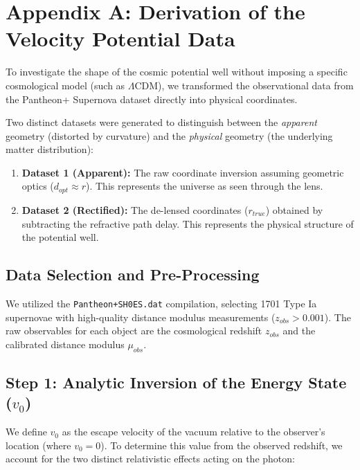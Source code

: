 \documentclass[11pt]{article}
\begin{document}
\appendix

\section{Appendix A: Derivation of the Velocity Potential Data}
\label{app:data_reconstruction}

To investigate the shape of the cosmic potential well without imposing a specific cosmological model (such as $\Lambda$CDM), we transformed the observational data from the Pantheon+ Supernova dataset directly into physical coordinates.

Two distinct datasets were generated to distinguish between the \textit{apparent} geometry (distorted by curvature) and the \textit{physical} geometry (the underlying matter distribution):
\begin{enumerate}
    \item \textbf{Dataset 1 (Apparent):} The raw coordinate inversion assuming geometric optics ($d_{opt} \approx r$). This represents the universe as seen through the lens.
    \item \textbf{Dataset 2 (Rectified):} The de-lensed coordinates ($r_{true}$) obtained by subtracting the refractive path delay. This represents the physical structure of the potential well.
\end{enumerate}

\subsection*{Data Selection and Pre-Processing}
We utilized the \texttt{Pantheon+SH0ES.dat} compilation, selecting 1701 Type Ia supernovae with high-quality distance modulus measurements ($z_{obs} > 0.001$). The raw observables for each object are the cosmological redshift $z_{obs}$ and the calibrated distance modulus $\mu_{obs}$.

\subsection{Step 1: Analytic Inversion of the Energy State ($v_0$)}

We define $v_0$ as the escape velocity of the vacuum relative to the observer's location (where $v_0=0$). To determine this value from the observed redshift, we account for the two distinct relativistic effects acting on the photon:
\end{document}
